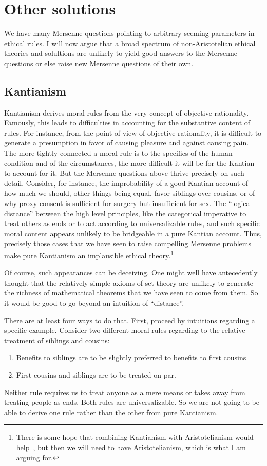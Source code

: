 \section{Other solutions}
We have many Mersenne questions pointing to arbitrary-seeming parameters in ethical rules.
I will now argue that a broad spectrum of non-Aristotelian ethical theories and solultions are unlikely to yield good answers to the Mersenne questions
or else raise new Mersenne questions of their own.

\subsection{Kantianism}
Kantianism  derives moral rules from the very concept of objective rationality. Famously, this leads to difficulties in
accounting for the substantive content of rules. For instance, from the point of view of objective rationality, it is difficult
to generate a presumption in favor of causing pleasure and against causing pain. The more tightly connected a moral rule is to the
specifics of the human condition and of the circumstances, the more difficult it will be for the Kantian to account for it. But the Mersenne questions above
thrive precisely on such detail. Consider, for instance, the improbability of a good Kantian account of how much we 
should, other things being equal, favor siblings over cousins, or of why proxy consent is sufficient for surgery but insufficient for
sex. The ``logical distance'' between the high level principles, like the categorical imperative to treat others as ends or to act according to universalizable rules, and such specific moral content appears unlikely to be bridgeable in a pure Kantian account.
Thus, precisely those cases that we have seen to raise compelling Mersenne problems make pure Kantianism an implausible ethical theory.\footnote{There is some hope that combining Kantianism with Aristotelianism would help~\parencite{MaglioDissertation}, but then
we will need to have Aristotelianism, which is what I am arguing for. }

Of course, such appearances can be deceiving. One might well have antecedently thought that the relatively simple axioms of set 
theory are unlikely to generate the richness of mathematical theorems that we have seen to come from them. So it would be good
to go beyond an intuition of ``distance''.

There are at least four ways to do that. First, proceed by intuitions regarding a specific example. Consider two different moral rules regarding to the relative treatment
of siblings and cousins:
\begin{enumerate}
\item[(i)] Benefits to siblings are to be slightly preferred to benefits to first cousins
\item[(ii)] First cousins and siblings are to be treated on par.
\end{enumerate}
Neither rule requires us to treat anyone as a mere means or 
takes away from treating people as ends. Both rules are universalizable. So we are not going to be able to derive one rule rather
than the other from pure Kantianism.

